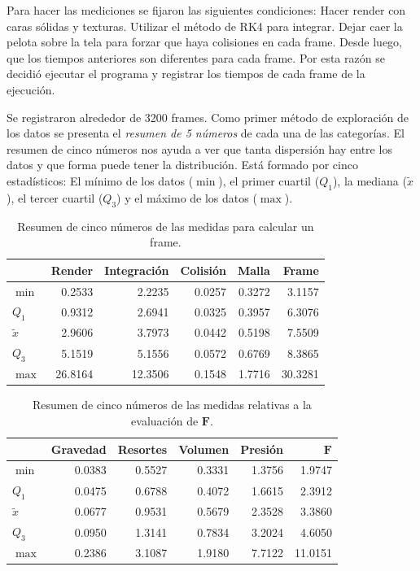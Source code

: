 Para hacer las mediciones se fijaron las siguientes condiciones:
Hacer render con caras sólidas y texturas.
Utilizar el método de RK4 para integrar.
Dejar caer la pelota sobre la tela para forzar que haya colisiones en cada frame.
Desde luego, que los tiempos anteriores son diferentes para cada frame.
Por esta razón se decidió ejecutar el programa y registrar los tiempos de cada frame de la ejecución.

Se registraron alrededor de 3200 frames.
Como primer método de exploración de los datos se presenta el \emph{resumen de 5 números} de cada una de las categorías.
El resumen de cinco números nos ayuda a ver que tanta dispersión hay entre los datos y que forma puede tener la distribución.
Está formado por cinco estadísticos: El mínimo de los datos ($\min$), el primer cuartil ($Q_1$), la mediana ($\tilde{x}$), el tercer cuartil ($Q_3$) y el máximo de los datos ($\max$).

\begin{table}
\begin{center}
\begin{tabular} {@{}lrrrrr@{}}
\toprule
 & Render & Integración & Colisión & Malla & Frame \\
\midrule 
 $\min$      &  0.2533 &  2.2235 & 0.0257 & 0.3272 &  3.1157 \\
 $Q_1$       &  0.9312 &  2.6941 & 0.0325 & 0.3957 &  6.3076 \\
 $\tilde{x}$ &  2.9606 &  3.7973 & 0.0442 & 0.5198 &  7.5509 \\
 $Q_3$       &  5.1519 &  5.1556 & 0.0572 & 0.6769 &  8.3865 \\
 $\max$      & 26.8164 & 12.3506 & 0.1548 & 1.7716 & 30.3281 \\
\bottomrule
\end{tabular}
\end{center}
\caption[Resumen de medidas por frame]{Resumen de cinco números de las medidas para calcular un frame.}
\label{resumenFrame:tabla}
\end{table}

\begin{table}
\begin{center}
\begin{tabular} {@{}lrrrrr@{}}
\toprule
 & Gravedad & Resortes & Volumen & Presión & $\textbf{F}$ \\
\midrule 
 $\min$      & 0.0383 & 0.5527 & 0.3331 & 1.3756 &  1.9747 \\
 $Q_1$       & 0.0475 & 0.6788 & 0.4072 & 1.6615 &  2.3912 \\
 $\tilde{x}$ & 0.0677 & 0.9531 & 0.5679 & 2.3528 &  3.3860 \\
 $Q_3$       & 0.0950 & 1.3141 & 0.7834 & 3.2024 &  4.6050 \\
 $\max$      & 0.2386 & 3.1087 & 1.9180 & 7.7122 & 11.0151 \\
\bottomrule
\end{tabular}
\end{center}
\caption[Resumen de medidas de evaluación de $\textbf{F}$]{Resumen de cinco números de las medidas relativas a la evaluación de $\textbf{F}$.}
\label{resumenFuerza:tabla}
\end{table}

